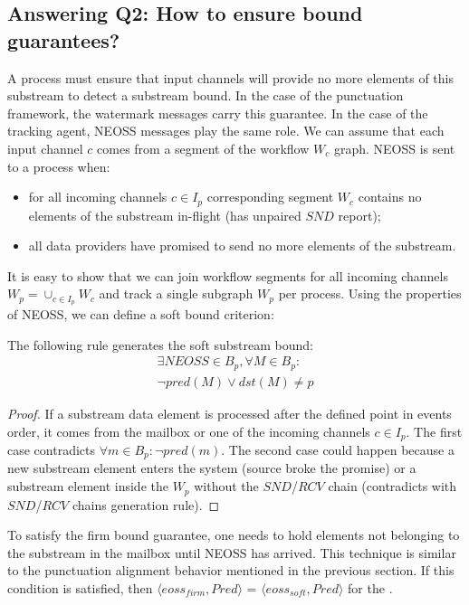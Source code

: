 \subsection{Answering Q2: How to ensure bound guarantees?}
A process must ensure that input channels will provide no more elements of this substream to detect a substream bound. In the case of the punctuation framework, the watermark messages carry this guarantee. In the case of the tracking agent, NEOSS messages play the same role. We can assume that each input channel $c$ comes from a segment of the workflow $W_c$ graph. NEOSS is sent to a process when:
\begin{itemize}
    \item for all incoming channels $c \in I_p$ corresponding segment $W_c$ contains no elements of the substream in-flight (has unpaired $SND$ report);
    \item all data providers have promised to send no more elements of the substream.
\end{itemize}
It is easy to show that we can join workflow segments for all incoming channels $W_p = \cup_{c\in I_p} W_c$ and track a single subgraph $W_p$ per process. Using the properties of NEOSS, we can define a soft bound criterion:
\begin{lemma}
The following rule generates the soft substream bound:
\begin{multline}
 \exists NEOSS \in B_p, \forall M\in B_p : \\ \neg pred(M) \vee dst(M) \ne p
\end{multline}
\end{lemma}
\begin{proof}
If a substream data element is processed after the defined point in events order, it comes from the mailbox or one of the incoming channels $c \in I_p$. The first case contradicts $\forall m\in B_p : \neg pred(m)$. The second case could happen because a new substream element enters the system (source broke the promise) or a substream element inside the $W_p$ without the $SND$/$RCV$ chain (contradicts with $SND$/$RCV$ chains generation rule). 
\end{proof}

To satisfy the firm bound guarantee, one needs to hold elements not belonging to the substream in the mailbox until NEOSS has arrived. This technique is similar to the punctuation alignment behavior mentioned in the previous section. If this condition is satisfied, then $\langle eoss_{firm}, Pred\rangle$ = $\langle eoss_{soft}, Pred\rangle$ for the \tracker.

